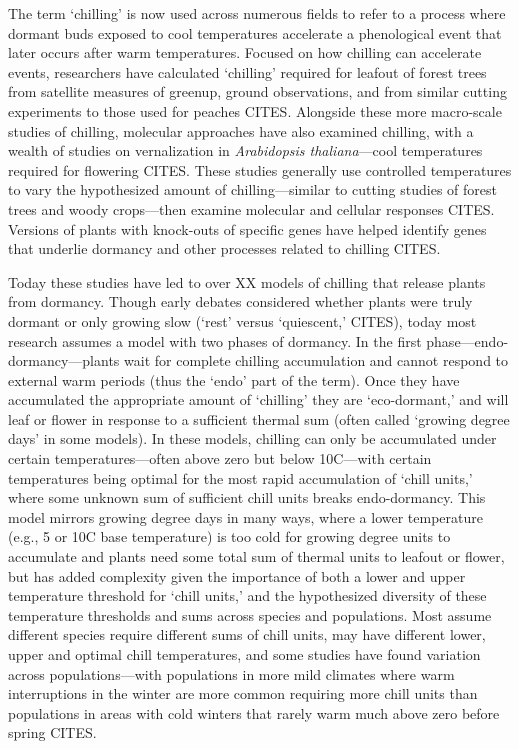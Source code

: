 \documentclass[11pt]{article}
\begin{document}
The term `chilling' is now used across numerous fields to refer to a process where dormant buds exposed to cool temperatures accelerate a phenological event that later occurs after warm temperatures. Focused on how chilling can accelerate events, researchers have calculated `chilling' required for leafout of forest trees from satellite measures of greenup, ground observations, and from similar cutting experiments to those used for peaches CITES.  %
Alongside these more macro-scale studies of chilling, molecular approaches have also examined chilling, with a wealth of studies on vernalization in \emph{Arabidopsis thaliana}---cool temperatures required for flowering CITES. These studies generally use controlled temperatures to vary the hypothesized amount of chilling---similar to cutting studies of forest trees and woody crops---then examine molecular and cellular responses CITES. Versions of plants with knock-outs of specific genes have helped identify genes that underlie dormancy and other processes related to chilling CITES. 

Today these studies have led to over XX models of chilling that release plants from dormancy. Though early debates considered whether plants were truly dormant or only growing slow (`rest' versus `quiescent,' CITES), today most research assumes a model with two phases of dormancy. In the first phase---endo-dormancy---plants wait for complete chilling accumulation and cannot respond to external warm periods (thus the `endo' part of the term). Once they have accumulated the appropriate amount of `chilling' they are `eco-dormant,' and will leaf or flower in response to a sufficient thermal sum (often called `growing degree days' in some models). In these models, chilling can only be accumulated under certain temperatures---often above zero but below 10\degree C---with certain temperatures being optimal for the most rapid accumulation of `chill units,' where some unknown sum of sufficient chill units breaks endo-dormancy. This model mirrors growing degree days in many ways, where a lower temperature (e.g., 5 or 10\degree C base temperature) is too cold for growing degree units to accumulate and plants need some total sum of thermal units to leafout or flower, but has added complexity given the importance of both a lower and upper temperature threshold for `chill units,' and the hypothesized diversity of these temperature thresholds and sums across species and populations. Most assume different species require different sums of chill units, may have different lower, upper and optimal chill temperatures, and some studies have found variation across populations---with populations in more mild climates where warm interruptions in the winter are more common requiring more chill units than populations in areas with cold winters that rarely warm much above zero before spring CITES. 
\end{document}
